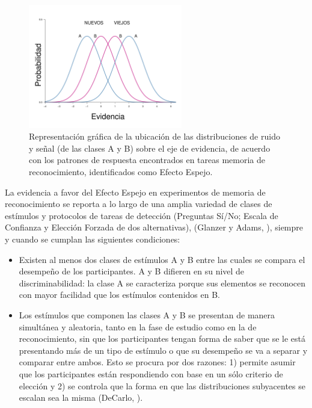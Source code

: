 \begin{figure}[h]
\centering
\includegraphics[width=0.6\textwidth]{Figures/EfectoEspejo}
\decoRule
\caption[Efecto Espejo: Las distribuciones de ruido y señal A y B se reflejan entre sí]{Representación gráfica de la ubicación de las distribuciones de ruido y señal (de las clases A y B) sobre el eje de evidencia, de acuerdo con los patrones de respuesta encontrados en tareas memoria de reconocimiento, identificados como Efecto Espejo.}
\label{fig:Ejem_EfectoEspejo}
\end{figure}

La evidencia a favor del Efecto Espejo en experimentos de memoria de reconocimiento se reporta a lo largo de una amplia variedad de clases de estímulos y protocolos de tareas de detección (Preguntas Sí/No; Escala de Confianza y Elección Forzada de dos alternativas), (Glanzer y Adams, \citeyear{Glanzer1990}), siempre y cuando se cumplan las siguientes condiciones:\\

\begin{itemize}
\item Existen al menos dos clases de estímulos A y B entre las cuales se compara el desempeño de los participantes. A y B difieren en su nivel de discriminabilidad: la clase A se caracteriza porque sus elementos se reconocen con mayor facilidad que los estímulos contenidos en B.\\

\item Los estímulos que componen las clases A y B se presentan de manera simultánea y aleatoria, tanto en la fase de estudio como en la de reconocimiento, sin que los participantes tengan forma de saber que se le está presentando más de un tipo de estímulo o que su desempeño se va a separar y comparar entre ambos. Esto se procura por dos razones: 1) permite asumir que los participantes están respondiendo con base en un sólo criterio de elección y 2) se controla que la forma en que las distribuciones subyacentes se escalan sea la misma (DeCarlo, \citeyear{DeCarlo2007}).\\
\end{itemize}

